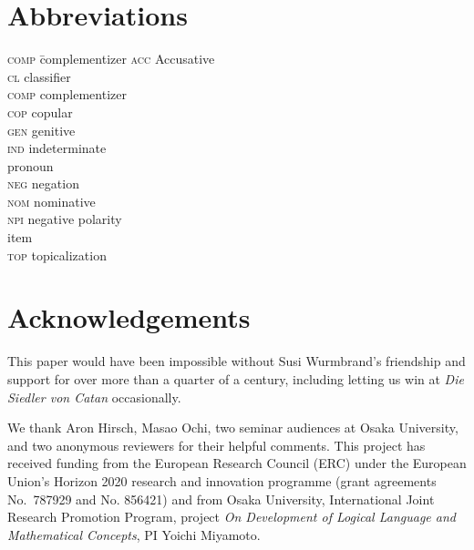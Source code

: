 \documentclass[output=paper]{langscibook}
\begin{document}
\section*{Abbreviations}
\begin{multicols}{3}
\begin{tabbing}
\textsc{comp} \hspace{.5ex}\= complementizer\kill
\textsc{acc}  \> Accusative       \\
\textsc{cl}   \> classifier      \\
\textsc{comp} \> complementizer    \\
\textsc{cop}  \> copular        \\
\textsc{gen}  \> genitive       \\  
\textsc{ind}  \> indeterminate \\ \> pronoun         \\
\textsc{neg}  \> negation               \\
\textsc{nom}  \> nominative             \\
\textsc{npi}  \> negative polarity \\ \> item \\
\textsc{top}  \> topicalization   
\end{tabbing}
\end{multicols}

\section*{Acknowledgements}

This paper would have been impossible without Susi Wurmbrand's friendship and support for over more than a quarter of a century, including letting us win at \emph{Die Siedler von Catan} occasionally.

We thank Aron Hirsch, Masao Ochi, two seminar audiences at Osaka University, and two anonymous reviewers for their helpful comments.  This project has received funding from the European Research Council (ERC) under the European Union's Horizon 2020 research and innovation programme (grant agreements No.\ 787929 and No. 856421) and from Osaka University, International Joint Research Promotion Program, project \emph{On Development of Logical Language and Mathematical Concepts}, PI Yoichi Miyamoto.

\printbibliography[heading=subbibliography,notkeyword=this]
\end{document}
